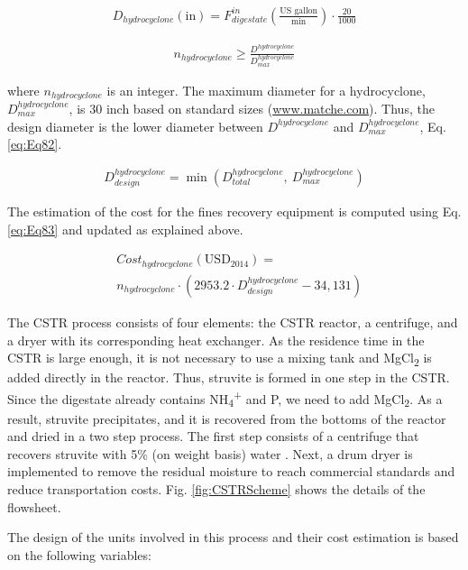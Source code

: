 \begin{refsection}[referencesCh2]
\begin{align}
	{D}_{hydrocyclone}\left( {\text{in}} \right) = F_{digestate}^{in} \left( \frac{\text{US gallon}}{\text{min}} \right) \cdot \frac{20}{1000} \label{eq:Eq80}
\end{align}

\begin{align}
	{n}_{hydrocyclone} \ge \frac{D^{hydrocyclone}}{D_{max}^{hydrocyclone}} \label{eq:Eq81}
\end{align}

where ${n}_{hydrocyclone}$ is an integer. The maximum diameter for a hydrocyclone, $D_{max}^{hydrocyclone}$,  is 30 inch based on standard sizes (\url{www.matche.com}).  Thus, the design diameter is the lower diameter between $D^{hydrocyclone}$ and $D_{max}^{hydrocyclone}$, Eq. \ref{eq:Eq82}.

\begin{align}
	D_{design}^{hydrocyclone} = \min (D_{total}^{hydrocyclone}, \ D_{max}^{hydrocyclone}) \label{eq:Eq82}
\end{align}

The estimation of the cost for the fines recovery equipment is computed using Eq. \ref{eq:Eq83} and updated as explained above.

\begin{align}
	& Cost_{hydrocyclone} \left( \text{USD}_{2014} \right) = \label{eq:Eq83} \\
	& {n}_{hydrocyclone} \cdot \left( {2953.2} \cdot D_{design}^{hydrocyclone} - 34,131 \right) \nonumber
\end{align}

The CSTR process consists of four elements: the CSTR reactor, a centrifuge, and a dryer with its corresponding heat exchanger. As the residence time in the CSTR is large enough, it is not necessary to use a mixing tank and MgCl\textsubscript{2} is added directly in the reactor. Thus, struvite is formed in one step in the CSTR. Since the digestate already contains NH\textsubscript{4}\textsuperscript{+} and P, we need to add MgCl\textsubscript{2}. As a result, struvite precipitates, and it is recovered from the bottoms of the reactor and dried in a two step process. The first step consists of a centrifuge that recovers struvite with 5\% (on weight basis) water \citep{baasal1989preliminary}. Next, a drum dryer is implemented to remove the residual moisture to reach commercial standards and reduce transportation costs. Fig. \ref{fig:CSTRScheme} shows the details of the flowsheet. 

The design of the units involved in this process and their cost estimation is based on the following variables:


\end{refsection}
